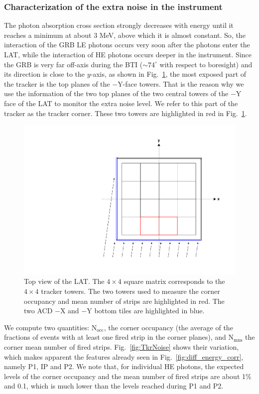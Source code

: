 \documentclass[preprint]{aastex631}
\begin{document}
\subsubsection{Characterization of the extra noise in the instrument}
\label{sec:LEspectrum}

The photon absorption cross section strongly decreases with energy until it reaches a minimum at about 3 MeV, above which it is almost constant. So, the interaction of the GRB LE photons occurs very soon after the photons enter the LAT, while the interaction of HE photons occurs deeper in the instrument. Since the GRB is very far off-axis during the BTI ($\sim 74^\circ$ with respect to boresight) and its direction is close to the $y$-axis, as shown in Fig.~\ref{fig:LATgeometry}, the most exposed part of the tracker is the top planes of the $-$Y-face towers. That is the reason why we use the information of the two top planes of the two central towers of the $-$Y face of the LAT to monitor the extra noise level. We refer to this part of the tracker as the tracker corner. These two towers are highlighted in red in Fig.~\ref{fig:LATgeometry}.

\begin{figure}[t]
    \centering    
    \includegraphics[width=0.5\linewidth]{paper_TkrACDgeom.pdf}
    \caption{Top view of the LAT. The $4\times4$ square matrix corresponds to the $4\times4$ tracker towers. The two towers used to measure the corner occupancy and mean number of strips are highlighted in red. The two ACD $-$X and $-$Y bottom tiles are highlighted in blue. }
    \label{fig:LATgeometry}
\end{figure}

We compute two quantities: $\mathrm{N}_\mathrm{occ}$, the corner occupancy (the average of the fractions of events with at least one fired strip in the corner planes), and $\mathrm{N}_\mathrm{mns}$ the corner mean number of fired strips. Fig.~\ref{fig:TkrNoise} shows their variation, which makes apparent the features already seen in Fig.~\ref{fig:diff_energy_corr}, namely P1, IP and P2. We note that, for individual HE photons, the expected levels of the corner occupancy and the mean number of fired strips are about 1\% and 0.1, which is much lower than the levels reached during P1 and P2.
\end{document}
